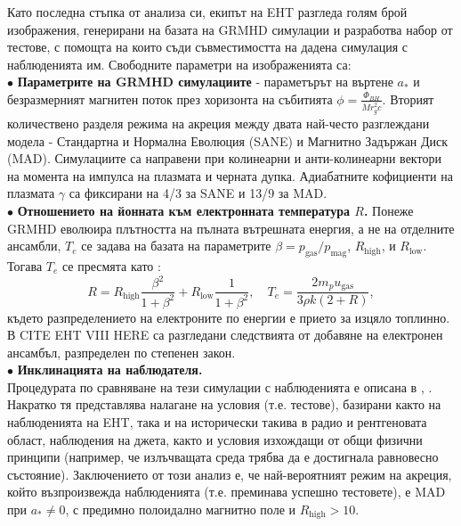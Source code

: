 Като последна стъпка от анализа си, екипът на EHT разгледа голям брой изображения, генерирани на базата на GRMHD симулации и разработва набор от тестове, с помощта на които съди съвместимостта на дадена симулация с наблюденията им. Свободните параметри на изображенията са:\\\newline
$\bullet$ \textbf{Параметрите на GRMHD симулациите} - параметърът на въртене $a_*$ и безразмерният магнитен поток през хоризонта на събитията $\phi = \frac{\Phi_{BH}}{\dot{M}r_g^2c}$. Вторият количествено разделя режима на акреция между двата най-често разглеждани модела - Стандартна и Нормална Еволюция (SANE) и Магнитно Задържан Диск (MAD). Симулациите са направени при колинеарни и анти-колинеарни вектори на момента на импулса на плазмата и черната дупка. Адиабатните кофициенти на плазмата $\gamma$ са фиксирани на 4/3 за SANE и 13/9 за MAD.\\\newline
$\bullet$ \textbf{Отношението на йонната към електронната температура $R$.} Понеже GRMHD еволюира плътността на пълната вътрешната енергия, а не на отделните ансамбли, $T_e$ се задава на базата на параметрите $\beta = p_{\text{gas}} / p_\text{mag}$, $R_\text{high}$, и $R_\text{low}$. Тогава $T_e$ се пресмята като \cite{EHT_M87_VIII}:
\begin{equation}
	R = R_\text{high}\frac{\beta^2}{1 + \beta^2} + R_\text{low}\frac{1}{1 + \beta^2},\quad T_e = \frac{2m_pu_\text{gas}}{3\rho k (2 + R)},
\end{equation}   
където разпределението на електроните по енергии е прието за изцяло топлинно. В CITE EHT VIII HERE са разгледани следствията от добавяне на електронен ансамбъл, разпределен по степенен закон.\\\newline
$\bullet$ \textbf{Инклинацията на наблюдателя.}\\

Процедурата по сравняване на тези симулации с наблюденията е описана в \cite{EHT_M87_V}, \cite{EHT_M87_VIII}. Накратко тя представлява налагане на условия (т.е. тестове), базирани както на наблюденията на EHT, така и на исторически такива в радио и рентгеновата област, наблюдения на джета, както и условия изхождащи от общи физични принципи (например, че излъчващата среда трябва да е достигнала равновесно състояние). Заключението от този анализ е, че най-вероятният режим на акреция, който възпроизвежда наблюденията (т.е. преминава успешно тестовете), е MAD при $a_*\ne 0$, с предимно полоидално магнитно поле и $R_\text{high} > 10$. 


